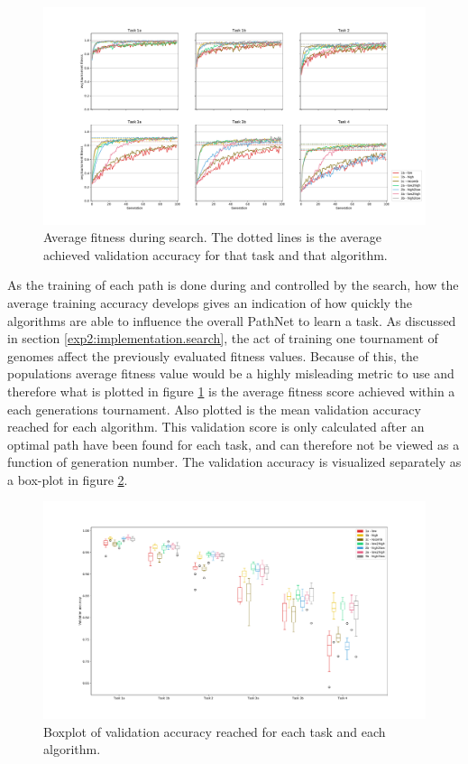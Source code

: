 \begin{figure}
    \includegraphics[width=1.2\textwidth,center]{Chapters/4.Experiments/exp2/figures/large/Training_accuracy.pdf}
    \caption[Fitness plot]{Average fitness during search. The dotted lines is the average achieved validation accuracy for that task and that algorithm.}
    \label{fig:search.accuracy}
\end{figure}

As the training of each path is done during and controlled by the search, how the average training accuracy develops gives an indication of how quickly the algorithms are able to influence the overall PathNet to learn a task. As discussed in section \ref{exp2:implementation.search}, the act of training one tournament of genomes affect the previously evaluated fitness values. Because of this, the populations average fitness value would be a highly misleading metric to use and therefore what is plotted in figure \ref{fig:search.accuracy} is the average fitness score achieved within a each generations tournament. Also plotted is the mean validation accuracy reached for each algorithm. This validation score is only calculated after an optimal path have been found for each task, and can therefore not be viewed as a function of generation number. The validation accuracy is visualized separately as a box-plot in figure \ref{fig:search.validation}.

\begin{figure}
    \includegraphics[width=1.2\textwidth, center]{Chapters/4.Experiments/exp2/figures/large/validation_boxplot.pdf}
    \caption[Validation accuracy plot]{Boxplot of validation accuracy reached for each task and each algorithm.}
    \label{fig:search.validation}
\end{figure}

